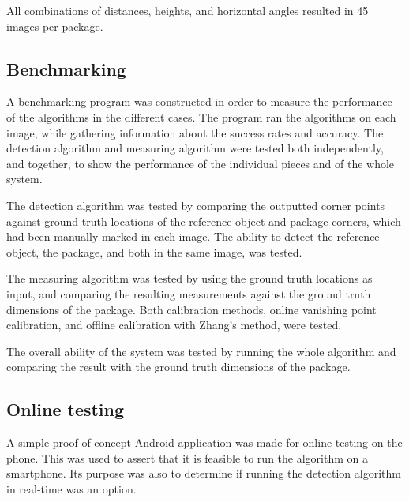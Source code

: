 All combinations of distances, heights, and horizontal angles resulted in 45 images per package.

\subsection{Benchmarking}
A benchmarking program was constructed in order to measure the performance of the algorithms in the different cases.
The program ran the algorithms on each image, while gathering information about the success rates and accuracy.
The detection algorithm and measuring algorithm were tested both independently, and together, to show the performance of the individual pieces and of the whole system. 

The detection algorithm was tested by comparing the outputted corner points against ground truth locations of the reference object and package corners, which had been manually marked in each image.
The ability to detect the reference object, the package, and both in the same image, was tested.

The measuring algorithm was tested by using the ground truth locations as input, and comparing the resulting measurements against the ground truth dimensions of the package.
Both calibration methods, online vanishing point calibration, and offline calibration with Zhang's method, were tested.

The overall ability of the system was tested by running the whole algorithm and comparing the result with the ground truth dimensions of the package. 




\subsection{Online testing}
A simple proof of concept Android application was made for online testing on the phone.
This was used to assert that it is feasible to run the algorithm on a smartphone.
Its purpose was also to determine if running the detection algorithm in real-time was an option.

